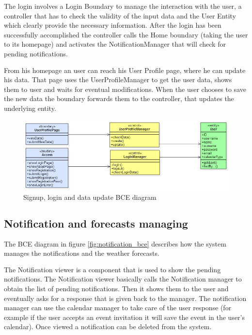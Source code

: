 \documentclass[10pt,a4paper,titlepage]{article}
\begin{document}
The login involves a Login Boundary to manage the interaction with the user, a controller that has to check the validity of the input data and the User Entity which clearly provide the necessary information. 
After the login has been successfully accomplished the controller calls the Home boundary (taking the user to its homepage) and activates the NotificationManager that will check for pending notifications.

From his homepage an user can reach his User Profile page, where he can update his data. That page uses the UserProfileManager to get the user data, shows them to user and waits for eventual modifications. When the user chooses to save the new data the boundary forwards them to the controller, that updates the underlying entity. 

\begin{figure}[h]
\centering
\includegraphics[width=\linewidth]{./bce/userProfile_bce}
\caption[user profile bce]{Signup, login and data update BCE diagram}
\label{fig:userProfile_bce}
\end{figure}

\subsection{Notification and forecasts managing}
The BCE diagram in figure \ref{fig:notification_bce} describes how the system manages the notifications and the weather forecasts.

The Notification viewer is a component that is used to show the pending notifications. The Notification viewer basically calls the Notification manager to obtain the list of pending notifications. Then it shows them to the user and eventually asks for a response that is given back to the manager. The notification manager can use the calendar manager to take care of the user response (for example if the user accepts an event invitation it will save the event in the user's calendar). Once viewed a notification can be deleted from the system.
\end{document}
